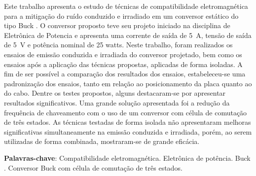 \begin{resumo}
	Este trabalho apresenta o estudo de técnicas de compatibilidade eletromagnética para a mitigação do ruído conduzido e irradiado em um conversor estático do tipo Buck \Interleaved. O conversor proposto teve seu projeto iniciado na disciplina de Eletrônica de Potencia e apresenta uma  corrente de saída de \SI{5}{\ampere}, tensão de saída de \SI{5}{\volt} e potência nominal de 25 watts. Neste trabalho, foram realizados os ensaios de emissão conduzida e irradiada do conversor projetado, bem como os ensaios após a aplicação das técnicas propostas, aplicadas de forma isoladas. A fim de ser possível a comparação dos resultados dos ensaios, estabeleceu-se uma padronização dos ensaios, tanto em relação ao posicionamento da placa quanto ao do cabo. Dentre os testes propostos, alguns destacaram-se por apresentar resultados significativos. Uma grande solução apresentada foi a redução da frequência de chaveamento com o uso de um conversor com célula de comutação de três estados. As técnicas testadas de forma isolada não apresentaram melhoras significativas simultaneamente na emissão conduzida e irradiada, porém, ao serem utilizadas de forma combinada, mostraram-se de grande eficácia.
	
	\textbf{Palavras-chave}: Compatibilidade eletromagnética. Eletrônica de potência. Buck \interleaved. Conversor Buck com célula de comutação de três estados.
\end{resumo}